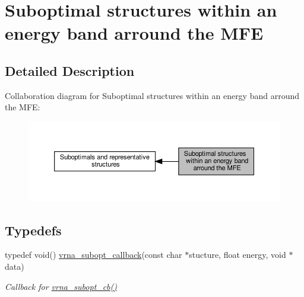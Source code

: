 \hypertarget{group__subopt__wuchty}{}\section{Suboptimal structures within an energy band arround the M\+FE}
\label{group__subopt__wuchty}


\subsection{Detailed Description}
Collaboration diagram for Suboptimal structures within an energy band arround the M\+FE\+:
\nopagebreak
\begin{figure}[H]
\begin{center}
\leavevmode
\includegraphics[width=350pt]{group__subopt__wuchty}
\end{center}
\end{figure}
\subsection*{Typedefs}
\begin{DoxyCompactItemize}
\item 
typedef void() \hyperlink{group__subopt__wuchty_gaa0270c66d04f59e750401695b8282e04}{vrna\+\_\+subopt\+\_\+callback}(const char $\ast$stucture, float energy, void $\ast$data)
\begin{DoxyCompactList}\small\item\em Callback for \hyperlink{group__subopt__wuchty_ga1053837e6b6f158093508f8a70998352}{vrna\+\_\+subopt\+\_\+cb()} \end{DoxyCompactList}\end{DoxyCompactItemize}
